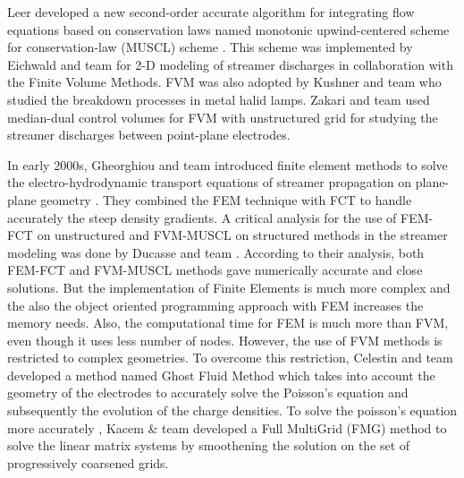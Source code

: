 Leer developed a new second-order accurate algorithm for integrating flow equations based on conservation laws named monotonic upwind-centered scheme for conservation-law (MUSCL) scheme \cite{Brahm Van Leer, 1979}. This scheme was implemented by Eichwald and team \cite{Eichwald et al, 1998, 2006} for 2-D modeling of streamer discharges in collaboration with the Finite Volume Methods. FVM was also adopted by Kushner and team \cite{Kushner et al 2003} who studied the breakdown processes in metal halid lamps. Zakari and team \cite{Zakari et al 2015} used median-dual control volumes for FVM with unstructured grid for studying the streamer discharges between point-plane electrodes.

In early 2000s, Gheorghiou and team introduced finite element methods to solve the electro-hydrodynamic transport equations of streamer propagation on plane-plane geometry \cite{Gheorghiou et al, 1999}. They combined the FEM technique with FCT to handle accurately the steep density gradients. A critical analysis for the use of FEM-FCT on unstructured and FVM-MUSCL on structured methods in the streamer modeling was done by Ducasse and team \cite{Ducasse et al 2007}. According to their analysis, both FEM-FCT and FVM-MUSCL methods gave numerically accurate and close solutions. But the implementation of Finite Elements is much more complex and the also the object oriented programming approach with FEM increases the memory needs. Also, the computational time for FEM is much more than FVM, even though it uses less number of nodes. However, the use of FVM methods is restricted to complex geometries. To overcome this restriction, Celestin and team \cite{Celestin et al, 2009} developed a method named Ghost Fluid Method which takes into account the geometry of the electrodes to accurately solve the Poisson's equation and subsequently the evolution of the charge densities. To solve the poisson's equation more accurately , Kacem & team \cite{Kacem et al 2011} developed a Full MultiGrid (FMG) method to solve the linear matrix systems by smoothening the solution on the set of progressively coarsened grids.

